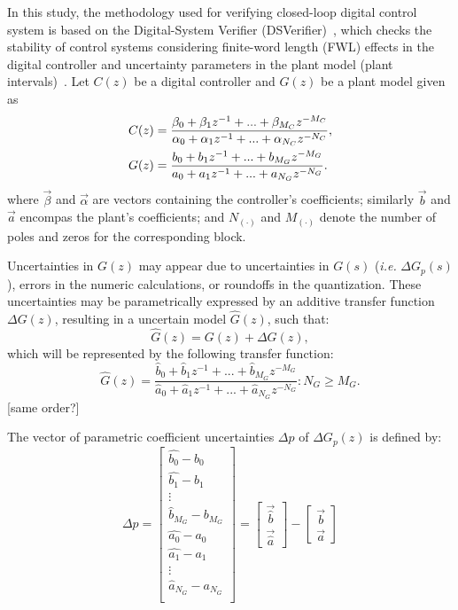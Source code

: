 \documentclass{sig-alternate-05-2015}
\newcommand{\red}[1]{{\color{red}#1}}
\begin{document}
In this study, the methodology used for verifying closed-loop digital
control system is based on the Digital-System Verifier
(DSVerifier)~\cite{IsmailBCFF15}, which checks the stability of control
systems considering finite-word length (FWL) effects in the digital
controller and uncertainty parameters in the plant model (plant
intervals)~\cite{Bessa16}.  Let $C(z)$ be a digital controller and $G(z)$ be
a plant model given as
%
\begin{align}
\small
\label{controller_plant_tf}
C(z)&=\frac{\beta_{0}+\beta_{1}z^{-1}+...+\beta_{M_C}z^{-M_C}}{\alpha_{0}+\alpha_{1}z^{-1}+...+\alpha_{N_C}z^{-N_C}}, \\
G(z)&=\frac{b_{0}+b_{1}z^{-1}+...+b_{M_G}z^{-M_G}}{a_{0}+a_{1}z^{-1}+...+a_{N_G}z^{-N_G}}.
\end{align}
%
\noindent where $\vec{\beta}$ and $\vec{\alpha}$ are vectors containing the controller's coefficients;  
similarly $\vec{b}$ and $\vec{a}$ encompas the plant's coefficients;  
and $N_{(\cdot)}$ and $M_{(\cdot)}$ denote the number of poles and zeros for the corresponding block.



Uncertainties in $G(z)$ may appear due to uncertainties in $G(s)$ (\emph{i.e.} $\Delta{G}_p(s)$), errors in the numeric calculations, or roundoffs in the quantization.
These uncertainties may be parametrically expressed by an additive transfer function $\Delta G(z)$, resulting in a uncertain model $\hat{G}(z)$, such that:
\begin{equation}
\hat{G}(z)=G(z)+\Delta G(z),
\end{equation}
which will be represented by the following transfer function:
\begin{equation}
\hat{G}(z)=\frac{\hat{b}_{0}+\hat{b}_{1}z^{-1}+...+\hat{b}_{M_G}z^{-M_G}}{\hat{a}_{0}+\hat{a}_{1}z^{-1}+...+\hat{a}_{N_G}z^{-N_G}} : N_G \geq M_G .
\end{equation}
\red{[same order?]} 

The vector of parametric coefficient uncertainties $\Delta{p}$ of $\Delta{G}_p(z)$ is defined by:
\begin{equation}
\Delta{p}=\begin{bmatrix}
\hat{b_{0}} - b_{0}\\
\hat{b_{1}} - b_{1}\\
\vdots \\
\hat{b}_{M_G} - b_{M_{G}}\\
\hat{a_{0}} - a_{0}\\
\hat{a_{1}} - a_{1}\\
\vdots\\
\hat{a}_{N_G} - a_{N_{G}}\\
\end{bmatrix}=\begin{bmatrix}
\vec{\hat{b}}\\
\vec{\hat{a}}
\end{bmatrix}-\begin{bmatrix}
\vec{b}\\
\vec{a}
\end{bmatrix}
\end{equation}
\end{document}
